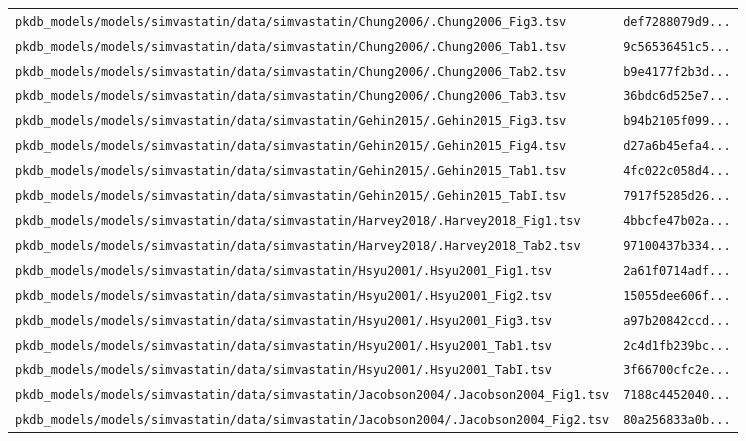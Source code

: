 \documentclass{article}
\begin{document}
\begin{longtable}{ll}
\texttt{pkdb\_models/models/simvastatin/data/simvastatin/Chung2006/.Chung2006\_Fig3.tsv} & \texttt{def7288079d9...} \\
\texttt{pkdb\_models/models/simvastatin/data/simvastatin/Chung2006/.Chung2006\_Tab1.tsv} & \texttt{9c56536451c5...} \\
\texttt{pkdb\_models/models/simvastatin/data/simvastatin/Chung2006/.Chung2006\_Tab2.tsv} & \texttt{b9e4177f2b3d...} \\
\texttt{pkdb\_models/models/simvastatin/data/simvastatin/Chung2006/.Chung2006\_Tab3.tsv} & \texttt{36bdc6d525e7...} \\
\texttt{pkdb\_models/models/simvastatin/data/simvastatin/Gehin2015/.Gehin2015\_Fig3.tsv} & \texttt{b94b2105f099...} \\
\texttt{pkdb\_models/models/simvastatin/data/simvastatin/Gehin2015/.Gehin2015\_Fig4.tsv} & \texttt{d27a6b45efa4...} \\
\texttt{pkdb\_models/models/simvastatin/data/simvastatin/Gehin2015/.Gehin2015\_Tab1.tsv} & \texttt{4fc022c058d4...} \\
\texttt{pkdb\_models/models/simvastatin/data/simvastatin/Gehin2015/.Gehin2015\_TabI.tsv} & \texttt{7917f5285d26...} \\
\texttt{pkdb\_models/models/simvastatin/data/simvastatin/Harvey2018/.Harvey2018\_Fig1.tsv} & \texttt{4bbcfe47b02a...} \\
\texttt{pkdb\_models/models/simvastatin/data/simvastatin/Harvey2018/.Harvey2018\_Tab2.tsv} & \texttt{97100437b334...} \\
\texttt{pkdb\_models/models/simvastatin/data/simvastatin/Hsyu2001/.Hsyu2001\_Fig1.tsv} & \texttt{2a61f0714adf...} \\
\texttt{pkdb\_models/models/simvastatin/data/simvastatin/Hsyu2001/.Hsyu2001\_Fig2.tsv} & \texttt{15055dee606f...} \\
\texttt{pkdb\_models/models/simvastatin/data/simvastatin/Hsyu2001/.Hsyu2001\_Fig3.tsv} & \texttt{a97b20842ccd...} \\
\texttt{pkdb\_models/models/simvastatin/data/simvastatin/Hsyu2001/.Hsyu2001\_Tab1.tsv} & \texttt{2c4d1fb239bc...} \\
\texttt{pkdb\_models/models/simvastatin/data/simvastatin/Hsyu2001/.Hsyu2001\_TabI.tsv} & \texttt{3f66700cfc2e...} \\
\texttt{pkdb\_models/models/simvastatin/data/simvastatin/Jacobson2004/.Jacobson2004\_Fig1.tsv} & \texttt{7188c4452040...} \\
\texttt{pkdb\_models/models/simvastatin/data/simvastatin/Jacobson2004/.Jacobson2004\_Fig2.tsv} & \texttt{80a256833a0b...} \\

\end{longtable}
\end{document}
